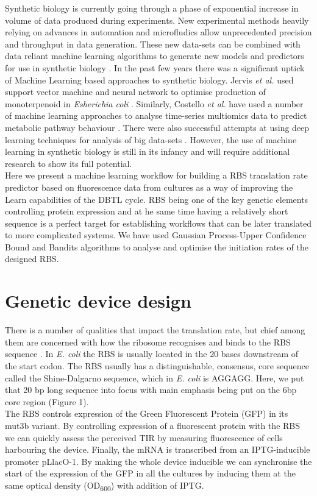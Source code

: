 \documentclass{article}
\begin{document}
Synthetic biology is currently going through a phase of exponential increase in volume of data produced during experiments. \cite{Freemont2019} New experimental methods heavily relying on advances in automation and microfludics allow unprecedented precision and throughput in data generation. These new data-sets can be combined with data reliant machine learning algorithms to generate new models and predictors for use in synthetic biology \cite{Camacho2018}. In the past few years there was a significant uptick of Machine Learning based approaches to synthetic biology. Jervis \emph{et al.} used support vector machine and neural network to optimise production of monoterpenoid in \emph{Esherichia coli} \cite{Jervis2019}. Similarly, Costello \emph{et al.} have used a number of machine learning approaches to analyse time-series multiomics data to predict metabolic pathway behaviour \cite{Costello2018}. There were also successful attempts at using deep learning techniques for analysis of big data-sets \cite{Alipanahi2015,Angermueller2016}. However, the use of machine learning in synthetic biology is still in its infancy and will require additional research to show its full potential. \\
Here we present a machine learning workflow for building a RBS translation rate predictor based on fluorescence data from cultures as a way of improving the Learn capabilities of the DBTL cycle. RBS being one of the key genetic elements controlling protein expression and at he same time having a relatively short sequence is a perfect target for establishing workflows that can be later translated to more complicated systems. We have used Gaussian Process-Upper Confidence Bound and Bandits algorithms to analyse and optimise the initiation rates of the designed RBS.

\section{Genetic device design}
There is a number of qualities that impact the translation rate, but chief among them are concerned with how the ribosome recognises and binds to the RBS sequence \cite{Chen1994,Vellanoweth1992}. In \emph{E. coli} the RBS is usually located in the 20 bases downstream of the start codon. The RBS usually has a distinguishable, consensus, core sequence called the Shine-Dalgarno sequence, which in \emph{E. coli} is AGGAGG. Here, we put that 20 bp long sequence into focus with main emphasis being put on the 6bp core region (Figure 1).\\
The RBS controls expression of the Green Fluorescent Protein (GFP) in its mut3b variant. By controlling expression of a fluorescent protein with the RBS we can quickly assess the perceived TIR by measuring fluorescence of cells harbouring the device. Finally, the mRNA is transcribed from an IPTG-inducible promoter pLlacO-1. By making the whole device inducible we can synchronise the start of the expression of the GFP in all the cultures by inducing them at the same optical density (OD\textsubscript{600}) with addition of IPTG.\\
\end{document}
